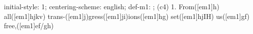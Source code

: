 initial-style: 1;
centering-scheme: english;
def-m1: \grealign;
(c4) 1. From([em1]h) all([em1]hjkv) trans-([em1]j)gress([em1]ji)ions([em1]hg) set([em1]hjIH) us([em1]gf) free,([em1]ef/gh)